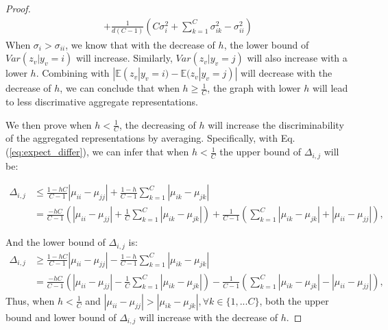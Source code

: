 \begin{proof}
\begin{equation}
\begin{aligned}
    +  \frac{1}{d(C-1)}(C\sigma_i^2 + \sum_{k=1}^C\sigma_{ik}^2 - \sigma_{ii}^2)
\end{aligned}
\end{equation}
When $\sigma_i > \sigma_{ii}$, we know that with the decrease of $h$, the lower bound of $Var({z}_{v}|y_v=i)$ will increase. Similarly,  $Var({z}_{v}|y_v=j)$ will also increase with a lower $h$. Combining with $|\mathbb{E}({z}_{v}|y_v=i)-\mathbb{E}({z}_{v}|y_v=j)|$ will decrease with the decrease of $h$, we can conclude that when $h \geq \frac{1}{C}$, the graph with lower $h$ will lead to less discrimative aggregate representations. 



We then prove when $h < \frac{1}{C}$, the decreasing of $h$ will increase the discriminability of the aggregated representations by averaging. Specifically, with Eq.(\ref{eq:expect_differ}), we can infer that when $h < \frac{1}{C}$ the upper bound of $\Delta_{i,j}$ will be:

\begin{equation}
\begin{aligned}
    \Delta_{i,j} & \leq \frac{1-hC}{C-1} |\mu_{ii}-\mu_{jj}|+\frac{1-h}{C-1}\sum_{k=1}^C|\mu_{ik}-\mu_{jk}| \\
    & = \frac{-hC}{C-1}(|\mu_{ii} - \mu_{jj}| + \frac{1}{C}\sum_{k=1}^C|\mu_{ik}-\mu_{jk}|) +\frac{1}{C-1}(\sum_{k=1}^C|\mu_{ik}-\mu_{jk}|+|\mu_{ii} - \mu_{jj}|),
\end{aligned}
\label{eq:differ}
\end{equation}

And the lower bound of $\Delta_{i,j}$ is:
\begin{equation}
\begin{aligned}
    \Delta_{i,j} & \geq \frac{1-hC}{C-1} |\mu_{ii}-\mu_{jj}|-\frac{1-h}{C-1}\sum_{k=1}^C|\mu_{ik}-\mu_{jk}| \\
    & = \frac{-hC}{C-1}(|\mu_{ii} - \mu_{jj}|-\frac{1}{C}\sum_{k=1}^C|\mu_{ik}-\mu_{jk}|) -\frac{1}{C-1}(\sum_{k=1}^C|\mu_{ik} - \mu_{jk}| - |\mu_{ii} - \mu_{jj}|),
\end{aligned}
\label{eq:differ}
\end{equation}
Thus, when $h < \frac{1}{C}$ and $|\mu_{ii}-\mu_{jj}|>|\mu_{ik} - \mu_{jk}|, \forall k \in \{1,...C\}$,  both the upper bound and lower bound of $\Delta_{i,j}$ will increase with the decrease of $h$.


\end{proof}
